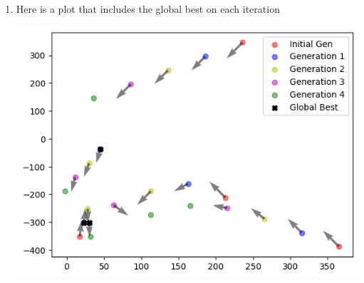 \documentclass[11pt]{article}
\begin{document}
\begin{enumerate}
\begin{enumerate}
\begin{enumerate}
\item Here is a plot that includes the global best on each iteration

\includegraphics{plot2Best.png}
\end{enumerate}
\end{enumerate}
\end{enumerate}
\end{document}
